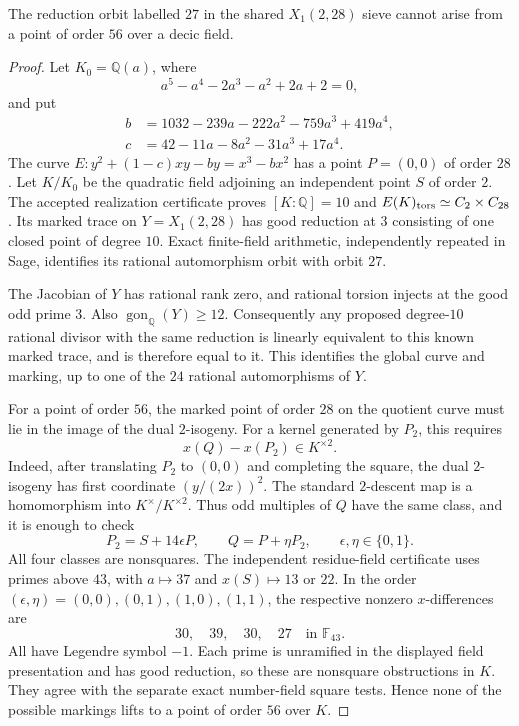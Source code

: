 \begin{lemma}\label{lem:decic56-known-quotient}
The reduction orbit labelled $27$ in the shared $X_1(2,28)$ sieve
cannot arise from a point of order $56$ over a decic field.
\end{lemma}
\begin{proof}
Let $K_0=\mathbb Q(a)$, where
\[
 a^5-a^4-2a^3-a^2+2a+2=0,
\]
and put
\[
 \begin{split}
 b&=1032-239a-222a^2-759a^3+419a^4,\\
 c&=42-11a-8a^2-31a^3+17a^4.
 \end{split}
\]
The curve $E:y^2+(1-c)xy-by=x^3-bx^2$ has a point
$P=(0,0)$ of order $28$. Let $K/K_0$ be the quadratic field adjoining
an independent point $S$ of order $2$. The accepted realization
certificate proves $[K:\mathbb Q]=10$ and
$E(K)_{\rm tors}\simeq C_2\times C_{28}$.
Its marked trace on $Y=X_1(2,28)$ has good reduction at $3$ consisting
of one closed point of degree $10$. Exact finite-field arithmetic,
independently repeated in Sage, identifies its rational automorphism
orbit with orbit $27$.

The Jacobian of $Y$ has rational rank zero, and rational torsion
injects at the good odd prime $3$. Also
$\operatorname{gon}_{\mathbb Q}(Y)\geq12$.
Consequently any proposed degree-$10$ rational divisor with the same
reduction is linearly equivalent to this known marked trace, and is
therefore equal to it. This identifies the global curve and marking,
up to one of the $24$ rational automorphisms of $Y$.

For a point of order $56$, the marked point of order $28$ on the
quotient curve must lie in the image of the dual $2$-isogeny.
For a kernel generated by $P_2$, this requires
\[
                 x(Q)-x(P_2)\in K^{\times2}.
\]
Indeed, after translating $P_2$ to $(0,0)$ and completing the square,
the dual $2$-isogeny has first coordinate $(y/(2x))^2$.
The standard $2$-descent map is a homomorphism into
$K^\times/K^{\times2}$. Thus odd multiples of $Q$ have the same
class, and it is enough to check
\[
 P_2=S+14\epsilon P,\qquad Q=P+\eta P_2,
 \qquad\epsilon,\eta\in\{0,1\}.
\]
All four classes are nonsquares. The independent residue-field
certificate uses primes above $43$, with $a\mapsto37$ and
$x(S)\mapsto13$ or $22$. In the order
$(\epsilon,\eta)=(0,0),(0,1),(1,0),(1,1)$, the respective nonzero
$x$-differences are
\[
                         30,\quad39,\quad30,\quad27
                         \quad\text{in }\mathbb F_{43}.
\]
All have Legendre symbol $-1$. Each prime is unramified in the displayed
field presentation and has good reduction, so these are nonsquare
obstructions in $K$. They agree with the separate exact number-field
square tests. Hence none of the possible markings lifts to a point
of order $56$ over $K$.
\end{proof}
